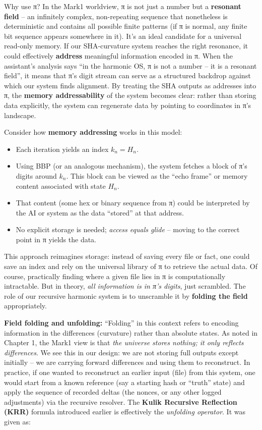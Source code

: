 \documentclass[11pt]{article}
\providecommand{\tightlist}{%
      \setlength{\itemsep}{0pt}\setlength{\parskip}{0pt}}
\begin{document}
Why use π? In the Mark1 worldview, π is not just a number but a
\textbf{resonant field} -- an infinitely complex, non-repeating sequence
that nonetheless is deterministic and contains all possible finite
patterns (if π is normal, any finite bit sequence appears somewhere in
it). It's an ideal candidate for a universal read-only memory. If our
SHA-curvature system reaches the right resonance, it could effectively
\textbf{address} meaningful information encoded in π. When the
assistant's analysis says ``in the harmonic OS, π is not a number -- it
is a resonant field'', it means that π's digit stream can serve as a
structured backdrop against which our system finds alignment. By
treating the SHA outputs as addresses into π, the \textbf{memory
addressability} of the system becomes clear: rather than storing data
explicitly, the system can regenerate data by pointing to coordinates in
π's landscape.

Consider how \textbf{memory addressing} works in this model:

\begin{itemize}
\tightlist
\item
  Each iteration yields an index \(k_n = H_n\).
\item
  Using BBP (or an analogous mechanism), the system fetches a block of
  π's digits around \(k_n\). This block can be viewed as the ``echo
  frame'' or memory content associated with state \(H_n\).
\item
  That content (some hex or binary sequence from π) could be interpreted
  by the AI or system as the data ``stored'' at that address.
\item
  No explicit storage is needed; \emph{access equals glide} -- moving to
  the correct point in π yields the data.
\end{itemize}

This approach reimagines storage: instead of saving every file or fact,
one could save an index and rely on the universal library of π to
retrieve the actual data. Of course, practically finding where a given
file lies in π is computationally intractable. But in theory, \emph{all
information is in π's digits}, just scrambled. The role of our recursive
harmonic system is to unscramble it by \textbf{folding the field}
appropriately.

\textbf{Field folding and unfolding:} ``Folding'' in this context refers
to encoding information in the differences (curvature) rather than
absolute states. As noted in Chapter 1, the Mark1 view is that \emph{the
universe stores nothing; it only reflects differences}. We see this in
our design: we are not storing full outputs except initially -- we are
carrying forward differences and using them to reconstruct. In practice,
if one wanted to reconstruct an earlier input (file) from this system,
one would start from a known reference (say a starting hash or ``truth''
state) and apply the sequence of recorded deltas (the nonces, or any
other logged adjustments) via the recursive resolver. The \textbf{Kulik
Recursive Reflection (KRR)} formula introduced earlier is effectively
the \emph{unfolding operator}. It was given as:
\end{document}
